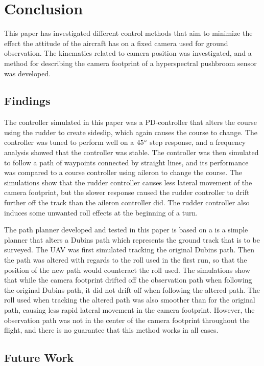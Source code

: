 \section{Conclusion}

This paper has investigated different control methods that aim to minimize the effect the attitude of the aircraft has on a fixed camera used for ground observation. The kinematics related to camera position was investigated, and a method for describing the camera footprint of a hyperspectral pushbroom sensor was developed.


\subsection{Findings}
The controller simulated in this paper was a PD-controller that alters the course using the rudder to create sideslip, which again causes the course to change. The controller was tuned to perform well on a $45\degree$ step response, and a frequency analysis showed that the controller was stable. The controller was then simulated to follow a path of waypoints connected by straight lines, and its performance was compared to a course controller using aileron to change the course. The simulations show that the rudder controller causes less lateral movement of the camera footprint, but the slower response caused the rudder controller to drift further off the track than the aileron controller did. The rudder controller also induces some unwanted roll effects at the beginning of a turn.

The path planner developed and tested in this paper is based on a is a simple planner that alters a Dubins path which represents the ground track that is to be surveyed. The UAV was first simulated tracking the original Dubins path. Then the path was altered with regards to the roll used in the first run, so that the position of the new path would counteract the roll used. The simulations show that while the camera footprint drifted off the observation path when following the original Dubins path, it did not drift off when following the altered path. The roll used when tracking the altered path was also smoother than for the original path, causing less rapid lateral movement in the camera footprint. However, the observation path was not in the center of the camera footprint throughout the flight, and there is no guarantee that this method works in all cases.


\subsection{Future Work}

